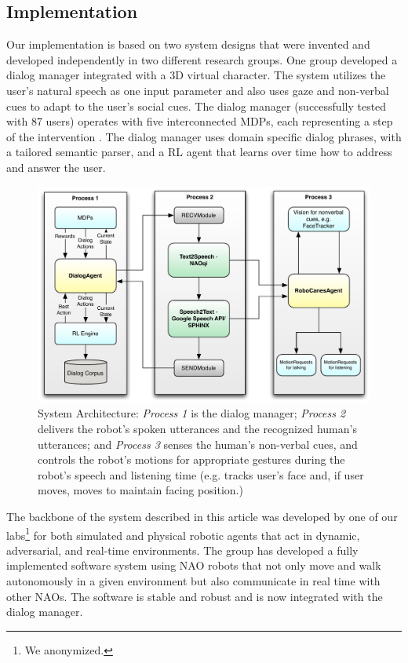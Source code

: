 \documentclass[letterpaper]{article}
\begin{document}
\begin{inparaenum}[1)]
\section*{Implementation} 

Our implementation is based on two system designs that were 
invented and developed independently in two different research groups. One  
group developed a dialog manager integrated with a 3D virtual 
character.  The system utilizes the user's natural speech as one input parameter and also uses gaze
and non-verbal cues to adapt to the user's social cues. The dialog manager (successfully 
tested with 87 users) operates with five
interconnected MDPs, each representing a step of the intervention \cite{YASCLL14}. The dialog 
manager uses domain specific dialog phrases, with a tailored semantic parser, and a RL agent that 
learns over time how to address and answer the user. 

\begin{figure}[!t] 
\centering 
\includegraphics[width=.46\textwidth]{figures/system} 
\caption{System Architecture: {\em Process 1} is the dialog manager; {\em Process 2} delivers the 
robot's spoken utterances and the recognized human's utterances; and {\em Process 3} senses the 
human's non-verbal cues, and controls the robot's motions for appropriate gestures during the 
robot's speech and listening time (e.g. tracks user's face and, if user moves, moves to maintain 
facing position.)} 
\label{fig:system} 
\end{figure}

The backbone of the system described in this article was developed by one of our 
labs\footnote{We anonymized.} for both simulated and
physical robotic agents that act in dynamic, adversarial, and real-time environments.    
The group has developed a fully implemented software system  using NAO robots that not 
only move and walk autonomously in a given environment but 
also communicate in real time with other NAOs. The 
software is stable and
robust and is now integrated with the dialog manager.


\end{inparaenum}
\end{document}
